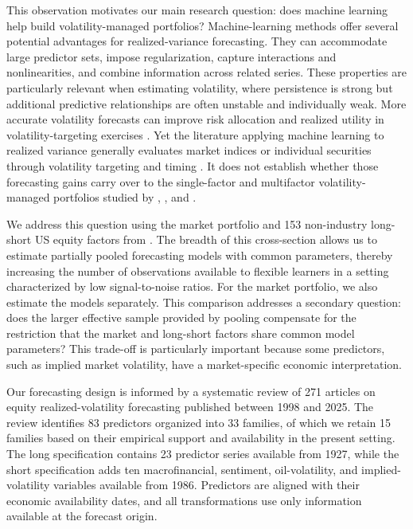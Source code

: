 \documentclass[preprint,12pt,authoryear]{elsarticle}
\begin{document}
This observation motivates our main research question: does machine learning help build volatility-managed portfolios? Machine-learning methods offer several potential advantages for realized-variance forecasting. They can accommodate large predictor sets, impose regularization, capture interactions and nonlinearities, and combine information across related series. These properties are particularly relevant when estimating volatility, where persistence is strong but additional predictive relationships are often unstable and individually weak. More accurate volatility forecasts can improve risk allocation and realized utility in volatility-targeting exercises \citep{bollerslevhoodhusspedersen2018}. Yet the literature applying machine learning to realized variance generally evaluates market indices or individual securities through volatility targeting and timing \citep{brancorubesamzevallos2024, diazhansencabrera2024, chunchoryu2025, rahimikiapoon2026}. It does not establish whether those forecasting gains carry over to the single-factor and multifactor volatility-managed portfolios studied by \citet{moreiramuir2017}, \citet{cederburg2020}, and \citet{demiguelmartinutrerauppal2024}.

We address this question using the market portfolio and 153 non-industry long-short US equity factors from \citet{jensenkellypedersen2023}. The breadth of this cross-section allows us to estimate partially pooled forecasting models with common parameters, thereby increasing the number of observations available to flexible learners in a setting characterized by low signal-to-noise ratios. For the market portfolio, we also estimate the models separately. This comparison addresses a secondary question: does the larger effective sample provided by pooling compensate for the restriction that the market and long-short factors share common model parameters? This trade-off is particularly important because some predictors, such as implied market volatility, have a market-specific economic interpretation.

Our forecasting design is informed by a systematic review of 271 articles on equity realized-volatility forecasting published between 1998 and 2025. The review identifies 83 predictors organized into 33 families, of which we retain 15 families based on their empirical support and availability in the present setting. The long specification contains 23 predictor series available from 1927, while the short specification adds ten macrofinancial, sentiment, oil-volatility, and implied-volatility variables available from 1986. Predictors are aligned with their economic availability dates, and all transformations use only information available at the forecast origin.
\end{document}
